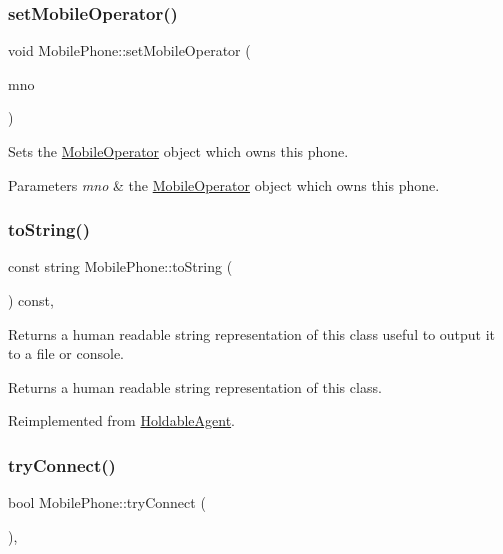 \subsubsection{\texorpdfstring{setMobileOperator()}{setMobileOperator()}}
{\footnotesize\ttfamily void Mobile\+Phone\+::set\+Mobile\+Operator (\begin{DoxyParamCaption}\item[{\mbox{\hyperlink{class_mobile_operator}{Mobile\+Operator}} $\ast$}]{mno }\end{DoxyParamCaption})}

Sets the \mbox{\hyperlink{class_mobile_operator}{Mobile\+Operator}} object which owns this phone. 
\begin{DoxyParams}{Parameters}
{\em mno} & the \mbox{\hyperlink{class_mobile_operator}{Mobile\+Operator}} object which owns this phone. \\
\hline
\end{DoxyParams}
\mbox{\label{class_mobile_phone_a2b7e556d12a43e380786ad0eccf3ce04}} 
\subsubsection{\texorpdfstring{toString()}{toString()}}
{\footnotesize\ttfamily const string Mobile\+Phone\+::to\+String (\begin{DoxyParamCaption}{ }\end{DoxyParamCaption}) const\hspace{0.3cm}{\ttfamily [override]}, {\ttfamily [virtual]}}

Returns a human readable string representation of this class useful to output it to a file or console. \begin{DoxyReturn}{Returns}
a human readable string representation of this class. 
\end{DoxyReturn}


Reimplemented from \mbox{\hyperlink{class_holdable_agent_a2c581226b8994f24b6b2306ae17dbb52}{Holdable\+Agent}}.

\mbox{\label{class_mobile_phone_ad91afa811cea8ee124167f5941bcda1b}} 
\subsubsection{\texorpdfstring{tryConnect()}{tryConnect()}}
{\footnotesize\ttfamily bool Mobile\+Phone\+::try\+Connect (\begin{DoxyParamCaption}{ }\end{DoxyParamCaption})\hspace{0.3cm}{\ttfamily [override]}, {\ttfamily [virtual]}}

